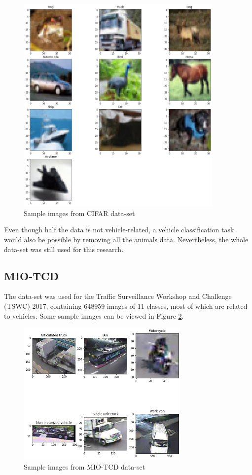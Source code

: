 \documentclass[12pt]{article}
\begin{document}
\begin{sloppypar}
\begin{figure}[h]
\caption{Sample images from CIFAR data-set}
\label{img:CIFAR-images}
\centering
\includegraphics[width=0.9\textwidth]{CIFAR_images.png}
\end{figure}

\noindent
Even though half the data is not vehicle-related, a vehicle classification task would also be possible by removing all the animals data. Nevertheless, the whole data-set was still used for this research.

\subsection{MIO-TCD}
The data-set was used for the Traffic Surveillance Workshop and Challenge (TSWC) 2017, containing 648959 images of 11 classes, most of which are related to vehicles. Some sample images can be viewed in Figure \ref{img:MIOTCD-images}.

\begin{figure}[h]
\caption{Sample images from MIO-TCD data-set}
\label{img:MIOTCD-images}
\centering
\includegraphics[width=0.75\textwidth]{MIOTCD_images.png}
\end{figure}


\end{sloppypar}
\end{document}
